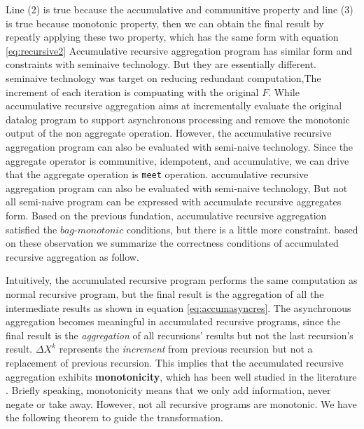 {{	\normalsize
	Line (2) is true because the accumulative and communitive property and line (3) is true because monotonic property, then we can obtain the final result by repeatly applying these two property, which has the same form with equation \ref{eq:recursive2}
}
{\color{red}
Accumulative recursive aggregation program has similar form and constraints with seminaive technology. But they are essentially different.
seminaive technology was target on reducing redundant computation,The increment of each iteration is compuating with the original $F$. While accumulative recursive aggregation aims at incrementally evaluate the original datalog program to support asynchronous processing and remove the monotonic output of the non aggregate operation. However, the accumulative recursive aggregation program can also be evaluated with semi-naive technology. Since the aggregate operator is communitive, idempotent, and accumulative, we can drive that the aggregate operation is \texttt{meet} operation.
}
{\color{green}	
accumulative recursive aggregation program can also be evaluated with semi-naive technology, 
But not all semi-naive program can be expressed with accumulate recursive aggregates form.  %
Based on the previous fundation, accumulative recursive aggregation  satisfied the $bag$-$monotonic$ conditions, but there is a little more constraint.
based on these observation we summarize the correctness conditions of accumulated recursive aggregation as follow.
}


{\color{green}
Intuitively, the accumulated recursive program performs the same computation as normal recursive program, but the final result is the aggregation of all the intermediate results as shown in equation \ref{eq:accumasyncres}. The asynchronous aggregation becomes meaningful in accumulated recursive programs, since the final result is the \emph{aggregation} of all recursions' results but not the last recursion's result. $\Delta X^{k}$ represents the \emph{increment} from previous recursion but not a replacement of previous recursion. This implies that the accumulated recursive aggregation exhibits \textbf{monotonicity}, which has been well studied in the literature \cite{Hellerstein:2010:DIE:1860702.1860704,calm,Lam:2013:SDE:2510649.2511289,Wang:2015:AFR:2824032.2824052}. Briefly speaking, monotonicity means that we only add information, never negate or take away. However, not all recursive programs are monotonic. We have the following theorem to guide the transformation.
}

}
